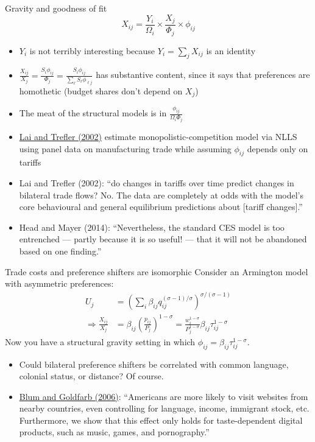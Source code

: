 \documentclass[10pt,notes=hide]{beamer}
\begin{document}
\begin{frame}{Gravity and goodness of fit}
\begin{equation*}
X_{ij} = {\frac{Y_i}{\Omega_i}} \times {\frac{X_j}{\Phi_j}} \times \phi_{ij}
\end{equation*}
\vspace{-4mm}
\begin{itemize}
	\item $Y_i$ is not terribly interesting because $Y_i = \sum_{j} X_{ij}$ is an identity
	\item $\frac{X_{ij}}{X_j} = \frac{S_{i} \phi_{ij}}{\Phi_j} = \frac{S_{i} \phi_{ij}}{\sum_{\ell} S_{\ell} \phi_{\ell j}}$ has substantive content, since it says that preferences are homothetic (budget shares don't depend on $X_j$)
	\item The meat of the structural models is in $\frac{\phi_{ij}}{\Omega_i \Phi_j}$
	\item \href{http://www-2.rotman.utoronto.ca/~dtrefler/papers/Lai_Trefler_2002.pdf}{Lai and Trefler (2002)} estimate monopolistic-competition model via NLLS using panel data on manufacturing trade while assuming $\phi_{ij}$ depends only on tariffs
	\item {\footnotesize Lai and Trefler (2002): ``do changes in tariffs over time predict changes in bilateral trade flows? No. The data are completely at odds with the model's core behavioural and general equilibrium predictions about  [tariff changes].''}
	\item {\small Head and Mayer (2014): ``Nevertheless, the standard CES model is too entrenched — partly because it is so useful! — that it will not be abandoned based on one finding.''}
\end{itemize}
\end{frame}
\begin{frame}{Trade costs and preference shifters are isomorphic}
Consider an Armington model with asymmetric preferences:
	\begin{align*}
	U_j &= \left(\sum_{i} \beta_{ij} q_{ij}^{(\sigma-1)/\sigma}\right)^{\sigma/(\sigma-1)}
	\\
	\Rightarrow
	\frac{X_{ij}}{X_j} &= \beta_{ij} \left(\frac{p_{ij}}{P_j}\right)^{1-\sigma} 
	=
	\frac{w_i^{1-\sigma}}{P_j^{1-\sigma}}\beta_{ij}\tau_{ij}^{1-\sigma}
	\end{align*}
Now you have a structural gravity setting in which $\phi_{ij}=\beta_{ij}\tau_{ij}^{1-\sigma}$.
\begin{itemize}
	\item Could bilateral preference shifters be correlated with common language, colonial status, or distance? Of course. 
	\item \href{https://www.sciencedirect.com/science/article/pii/S0022199606000225}{Blum and Goldfarb (2006)}: {\small ``Americans are more likely to visit websites from nearby countries, even controlling for language, income, immigrant stock, etc. Furthermore, we show that this effect only holds for taste-dependent digital products, such as music, games, and pornography.''}
\end{itemize}
\end{frame}
\end{document}
